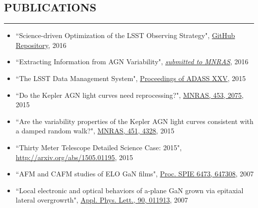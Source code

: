 \documentclass[10pt,a4]{article}
\newcounter{mySaveCounter}
\newcommand\myEnumReset{\setcounter{mySaveCounter}{0}}
\begin{document}
\subsection*{PUBLICATIONS}
\hrule  height 4pt
\vspace{0.2cm}
\begin{itemize}
  \item ``Science-driven Optimization of the LSST Observing Strategy", \href{https://github.com/LSSTScienceCollaborations/ObservingStrategy}{GitHub Repository}, 2016
	\item ``Extracting Information from AGN Variability", \href{https://arxiv.org/abs/1607.04299}{\textit{submitted to MNRAS}}, 2016
	\item ``The LSST Data Management System", \href{http://adsabs.harvard.edu/cgi-bin/bib_query?arXiv:1512.07914}{Proceedings of ADASS XXV}, 2015
	\item ``Do the Kepler AGN light curves need reprocessing?", \href{http://dx.doi.org/10.1093/mnras/stv1797}{MNRAS, 453, 2075}, 2015
	\item ``Are the variability properties of the Kepler AGN light curves consistent with a damped random walk?", \href{http://dx.doi.org/ 10.1093/mnras/stv1230}{MNRAS, 451, 4328}, 2015
	\item  ``Thirty Meter Telescope Detailed Science Case: 2015", \href{http://arxiv.org/abs/1505.01195}{http://arxiv.org/abs/1505.01195}, 2015
	\item  ``AFM and CAFM studies of ELO GaN films", \href{http://dx.doi.org/10.1117/12.706773}{Proc. SPIE 6473, 647308}, 2007
	\item ``Local electronic and optical behaviors of a-plane GaN grown via epitaxial lateral overgrowrth", \href{http://dx.doi.org/10.1063/1.2429901}{Appl. Phys. Lett., 90, 011913}, 2007
\end{itemize}
\myEnumReset
\end{document}
